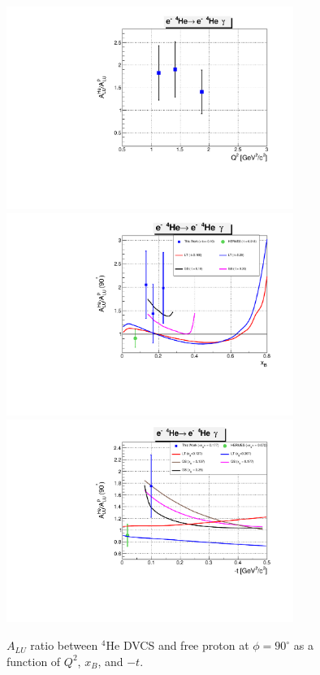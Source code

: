 \begin{enumerate}
  \begin{figure}[tbp]
    \includegraphics[height=6.6cm]{fig/BSA_ratio_coh_Q2.pdf}
    \includegraphics[height=6.6cm]{fig/BSA_ratio_coh_xB.pdf}
    \centering
    \includegraphics[height=6.6cm]{fig/BSA_ratio_coh_t.pdf}
    \caption{ $A_{LU}$ ratio between $^{4}$He DVCS and free proton at $\phi = 
    90 ^{\circ}$ as a function of $Q^{2}$, $x_{B}$, and $-t$.}
    \label{fig:coh-alu-ratios}
    \end{figure}


\end{enumerate}
